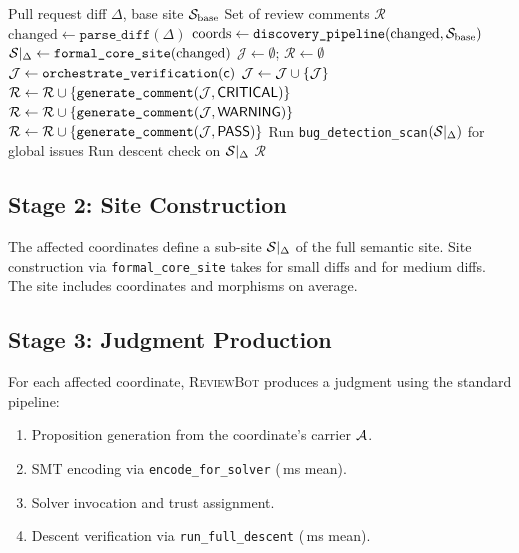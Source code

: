 \documentclass[11pt]{article}
\newcommand{\ReviewBot}{\textsc{ReviewBot}}
\newcommand{\SevCritical}{\mathsf{CRITICAL}}
\newcommand{\SevWarning}{\mathsf{WARNING}}
\newcommand{\SevPass}{\mathsf{PASS}}
\begin{document}
\begin{algorithm}[t]
\caption{Diff-Aware Review via \texttt{bug\_detection\_scan}}
\label{alg:review}
\begin{algorithmic}[1]
\REQUIRE Pull request diff $\Delta$, base site $\mathcal{S}_{\text{base}}$
\ENSURE Set of review comments $\mathcal{R}$
\STATE $\text{changed} \gets \texttt{parse\_diff}(\Delta)$
\STATE $\text{coords} \gets \texttt{discovery\_pipeline}(\text{changed}, \mathcal{S}_{\text{base}})$
\STATE $\mathcal{S}|_\Delta \gets \texttt{formal\_core\_site}(\text{changed})$
\STATE $\mathcal{J} \gets \emptyset$; $\mathcal{R} \gets \emptyset$
  \STATE $\mathcal{J} \gets \texttt{orchestrate\_verification}(\mathsf{c})$
  \STATE $\mathcal{J} \gets \mathcal{J} \cup \{\mathcal{J}\}$
    \STATE $\mathcal{R} \gets \mathcal{R} \cup \{\texttt{generate\_comment}(\J, \SevCritical)\}$
    \STATE $\mathcal{R} \gets \mathcal{R} \cup \{\texttt{generate\_comment}(\J, \SevWarning)\}$
  \ELSE
    \STATE $\mathcal{R} \gets \mathcal{R} \cup \{\texttt{generate\_comment}(\J, \SevPass)\}$
  \ENDIF
\ENDFOR
\STATE Run \texttt{bug\_detection\_scan}$(\mathcal{S}|_\Delta)$ for global issues
\STATE Run descent check on $\mathcal{S}|_\Delta$
\RETURN $\mathcal{R}$
\end{algorithmic}
\end{algorithm}

\subsection{Stage 2: Site Construction}

The affected coordinates define a sub-site $\mathcal{S}|_\Delta$ of the full
semantic site. Site construction via \texttt{formal\_core\_site} takes
\subFormalcoresiteSmallTime{} for small diffs and
\subFormalcoresiteMediumTime{} for medium diffs. The site includes
\compSiteMeanCoords{} coordinates and \compSiteMeanMorphisms{} morphisms
on average.

\subsection{Stage 3: Judgment Production}

For each affected coordinate, \ReviewBot{} produces a judgment using the
standard \JuGeo{} pipeline:
\begin{enumerate}
  \item Proposition generation from the coordinate's carrier $\mathcal{A}$.
  \item SMT encoding via \texttt{encode\_for\_solver}
        (\compProfEncodeForSolverMeanMs{}\,ms mean).
  \item Solver invocation and trust assignment.
  \item Descent verification via \texttt{run\_full\_descent}
        (\compProfRunFullDescentMeanMs{}\,ms mean).
\end{enumerate}
\end{document}
